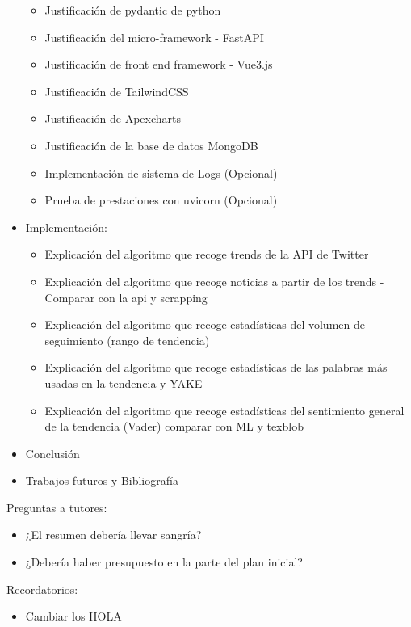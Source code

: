 \begin{itemize}
\begin{itemize}
    \item Justificación de pydantic de python
    \item Justificación del micro-framework - FastAPI
    \item Justificación de front end framework - Vue3.js
    \item Justificación de TailwindCSS
    \item Justificación de Apexcharts
    \item Justificación de la base de datos MongoDB
    \item Implementación de sistema de Logs (Opcional)
    \item Prueba de prestaciones con uvicorn (Opcional)
\end{itemize}
\item Implementación:
\begin{itemize}
    \item Explicación del algoritmo que recoge trends de la API de Twitter
    \item Explicación del algoritmo que recoge noticias a partir de los trends - Comparar con la api y scrapping
    \item Explicación del algoritmo que recoge estadísticas del volumen de seguimiento (rango de tendencia)
    \item Explicación del algoritmo que recoge estadísticas de las palabras más usadas en la tendencia y YAKE
    \item Explicación del algoritmo que recoge estadísticas del sentimiento general de la tendencia (Vader) comparar con ML y texblob
\end{itemize}
    \item Conclusión
    \item Trabajos futuros y Bibliografía
\end{itemize}
Preguntas a tutores:
\begin{itemize}
    \item ¿El resumen debería llevar sangría?
    \item ¿Debería haber presupuesto en la parte del plan inicial?
\end{itemize}
Recordatorios:
\begin{itemize}
    \item Cambiar los HOLA
\end{itemize}

